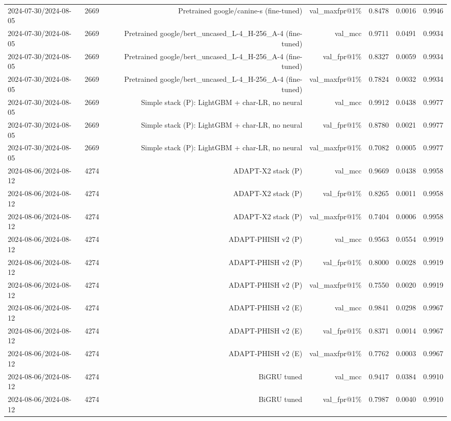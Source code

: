 \begin{table}[t]
\begin{tabular}{llrrrrr}
2024-07-30/2024-08-05 & 2669 & Pretrained google/canine-s (fine-tuned) & val\_maxfpr@1\% & 0.8478 & 0.0016 & 0.9946 \\
2024-07-30/2024-08-05 & 2669 & Pretrained google/bert\_uncased\_L-4\_H-256\_A-4 (fine-tuned) & val\_mcc & 0.9711 & 0.0491 & 0.9934 \\
2024-07-30/2024-08-05 & 2669 & Pretrained google/bert\_uncased\_L-4\_H-256\_A-4 (fine-tuned) & val\_fpr@1\% & 0.8327 & 0.0059 & 0.9934 \\
2024-07-30/2024-08-05 & 2669 & Pretrained google/bert\_uncased\_L-4\_H-256\_A-4 (fine-tuned) & val\_maxfpr@1\% & 0.7824 & 0.0032 & 0.9934 \\
2024-07-30/2024-08-05 & 2669 & Simple stack (P): LightGBM + char-LR, no neural & val\_mcc & 0.9912 & 0.0438 & 0.9977 \\
2024-07-30/2024-08-05 & 2669 & Simple stack (P): LightGBM + char-LR, no neural & val\_fpr@1\% & 0.8780 & 0.0021 & 0.9977 \\
2024-07-30/2024-08-05 & 2669 & Simple stack (P): LightGBM + char-LR, no neural & val\_maxfpr@1\% & 0.7082 & 0.0005 & 0.9977 \\
2024-08-06/2024-08-12 & 4274 & ADAPT-X2 stack (P) & val\_mcc & 0.9669 & 0.0438 & 0.9958 \\
2024-08-06/2024-08-12 & 4274 & ADAPT-X2 stack (P) & val\_fpr@1\% & 0.8265 & 0.0011 & 0.9958 \\
2024-08-06/2024-08-12 & 4274 & ADAPT-X2 stack (P) & val\_maxfpr@1\% & 0.7404 & 0.0006 & 0.9958 \\
2024-08-06/2024-08-12 & 4274 & ADAPT-PHISH v2 (P) & val\_mcc & 0.9563 & 0.0554 & 0.9919 \\
2024-08-06/2024-08-12 & 4274 & ADAPT-PHISH v2 (P) & val\_fpr@1\% & 0.8000 & 0.0028 & 0.9919 \\
2024-08-06/2024-08-12 & 4274 & ADAPT-PHISH v2 (P) & val\_maxfpr@1\% & 0.7550 & 0.0020 & 0.9919 \\
2024-08-06/2024-08-12 & 4274 & ADAPT-PHISH v2 (E) & val\_mcc & 0.9841 & 0.0298 & 0.9967 \\
2024-08-06/2024-08-12 & 4274 & ADAPT-PHISH v2 (E) & val\_fpr@1\% & 0.8371 & 0.0014 & 0.9967 \\
2024-08-06/2024-08-12 & 4274 & ADAPT-PHISH v2 (E) & val\_maxfpr@1\% & 0.7762 & 0.0003 & 0.9967 \\
2024-08-06/2024-08-12 & 4274 & BiGRU tuned & val\_mcc & 0.9417 & 0.0384 & 0.9910 \\
2024-08-06/2024-08-12 & 4274 & BiGRU tuned & val\_fpr@1\% & 0.7987 & 0.0040 & 0.9910 \\

\end{tabular}
\end{table}
